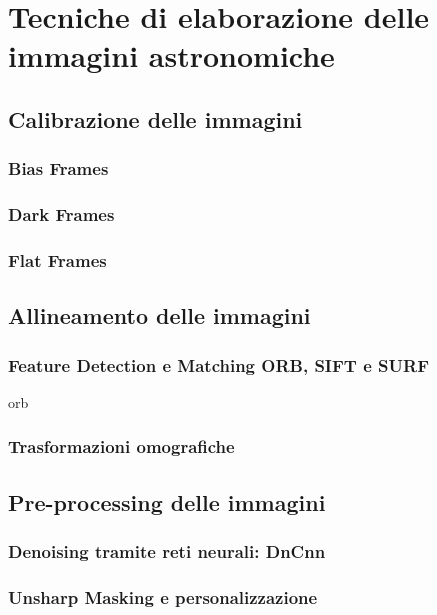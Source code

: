 \chapter{Tecniche di elaborazione delle immagini astronomiche} \label{chap:techniques}

\section{Calibrazione delle immagini}

\subsection{Bias Frames}

\subsection{Dark Frames}

\subsection{Flat Frames}

\section{Allineamento delle immagini}

\subsection{Feature Detection e Matching ORB, SIFT e SURF}

orb \cite{orb}

\subsection{Trasformazioni omografiche}

\section{Pre-processing delle immagini}

\subsection{Denoising tramite reti neurali: DnCnn}

\subsection{Unsharp Masking e personalizzazione}

